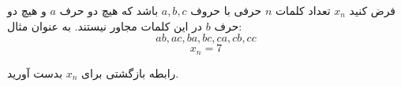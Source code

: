 \EXERCISE
فرض کنید
$x_n$
تعداد کلمات
$n$
حرفی با حروف
$a, b, c$
باشد که هیچ دو حرف
$a$
و هیچ دو حرف
$b$
در این کلمات مجاور نیستند. به عنوان مثال:
$$ab, ac, ba, bc, ca, cb, cc$$
$$x_n = 7$$

رابطه بازگشتی برای
$x_n$
بدست آورید.